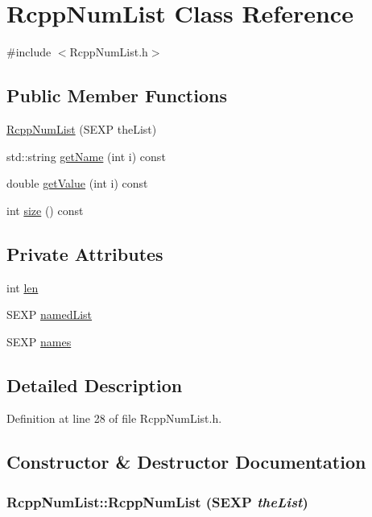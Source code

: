 \hypertarget{classRcppNumList}{
\section{RcppNumList Class Reference}
\label{classRcppNumList}
}


{\ttfamily \#include $<$RcppNumList.h$>$}\subsection*{Public Member Functions}
\begin{DoxyCompactItemize}
\item 
\hyperlink{classRcppNumList_a4a8a321d0dc84b6d4be988005fa74fcd}{RcppNumList} (SEXP theList)
\item 
std::string \hyperlink{classRcppNumList_aabd02f34fb896791cb5ffb64f29d8f62}{getName} (int i) const 
\item 
double \hyperlink{classRcppNumList_a20200d6f7e0daf7736675bcc6700d64c}{getValue} (int i) const 
\item 
int \hyperlink{classRcppNumList_afb82fcc91a60ceca5a2dd389cf02f8fe}{size} () const 
\end{DoxyCompactItemize}
\subsection*{Private Attributes}
\begin{DoxyCompactItemize}
\item 
int \hyperlink{classRcppNumList_ac4cb5c784f7105f0f28ae48d02deb3a1}{len}
\item 
SEXP \hyperlink{classRcppNumList_a7464927aafe555a0c4a104247dba7185}{namedList}
\item 
SEXP \hyperlink{classRcppNumList_aa669b28cba0c95531a3c92910a60ecb0}{names}
\end{DoxyCompactItemize}


\subsection{Detailed Description}


Definition at line 28 of file RcppNumList.h.

\subsection{Constructor \& Destructor Documentation}
\hypertarget{classRcppNumList_a4a8a321d0dc84b6d4be988005fa74fcd}{
\subsubsection[{RcppNumList}]{\setlength{\rightskip}{0pt plus 5cm}RcppNumList::RcppNumList (SEXP {\em theList})}}
\label{classRcppNumList_a4a8a321d0dc84b6d4be988005fa74fcd}


